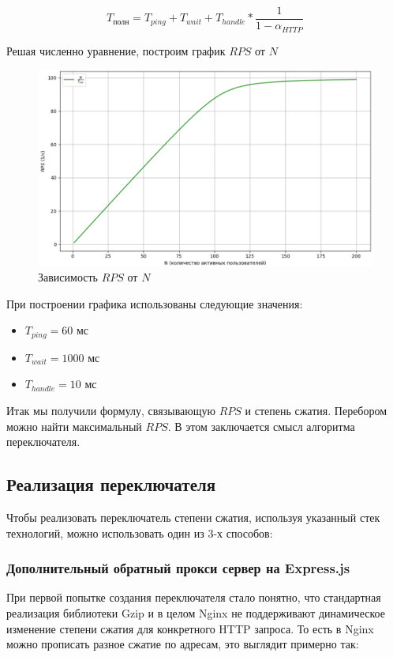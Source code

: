 \documentclass[12pt]{article}
\begin{document}
\[
    T_{\text{полн}} = T_{ping} + T_{wait} + T_{handle}*\frac{1}{1 - \alpha_{HTTP}}
\]

Решая численно уравнение, построим график $RPS$ от $N$

\begin{figure}[H]
    \centering
    \includegraphics[width=1\textwidth]{../images/rps-from-n.png}
    \caption{Зависимость $RPS$ от $N$}
\end{figure}

При построении графика использованы следующие значения:

\begin{itemize}
    \item $T_{ping} = 60   \text{ мс}$
    \item $T_{wait} = 1000 \text{ мс}$
    \item $T_{handle} = 10 \text{ мс}$
\end{itemize}

Итак мы получили формулу, связывающую $RPS$ и степень сжатия. Перебором можно найти максимальный $RPS$. В этом заключается смысл алгоритма переключателя.

\subsection{Реализация переключателя}

Чтобы реализовать переключатель степени сжатия, используя указанный стек технологий, можно использовать один из 3-х способов:

\subsubsection{Дополнительный обратный прокси сервер на Express.js}

При первой попытке создания переключателя стало понятно, что стандартная реализация библиотеки Gzip и в целом Nginx не поддерживают динамическое изменение степени сжатия для конкретного HTTP запроса. То есть в Nginx можно прописать разное сжатие по адресам, это выглядит примерно так:
\end{document}
